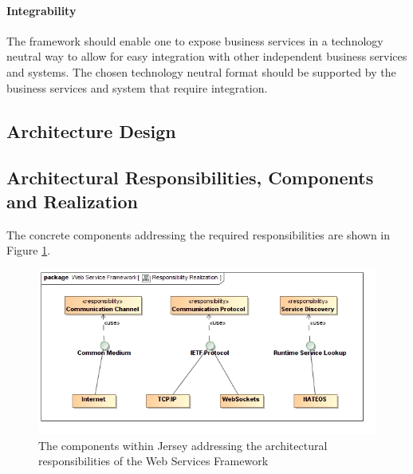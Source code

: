 \paragraph*{Integrability}
The framework should enable one to expose business services in a technology
neutral way to allow for easy integration with other independent business
services and systems.  The chosen technology neutral format should be supported
by the business services and system that require integration.



\subsection{Architecture Design}
\subsection{Architectural Responsibilities, Components and Realization}
The concrete components addressing the required responsibilities are shown in Figure \ref{fig:webServicesFrameworkResponsibilityRealization}.
\begin{figure}[H]
	\begin{center}
	\includegraphics[scale=0.5]{../Diagrams and Charts/Web Services Framework/ResponsibilityRealization.jpg}
	\caption{The components within Jersey addressing the architectural responsibilities of the Web Services Framework}
	\label{fig:webServicesFrameworkResponsibilityRealization}
	\end{center}
\end{figure}

